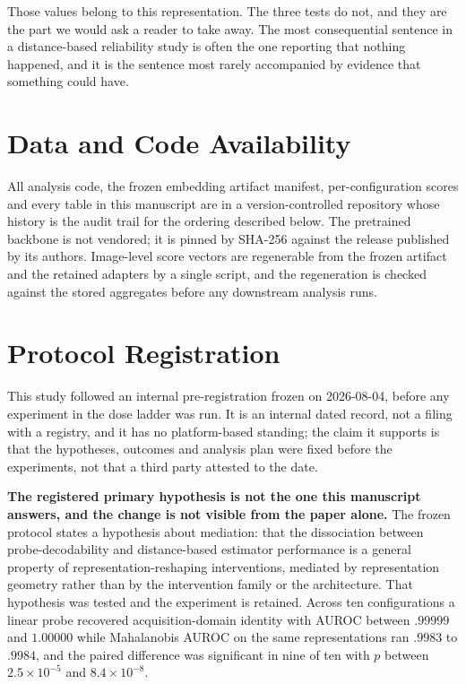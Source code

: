 \documentclass[11pt,a4paper]{article}
\begin{document}
Those values belong to this representation. The three tests do not, and they
are the part we would ask a reader to take away. The most consequential
sentence in a distance-based reliability study is often the one reporting that
nothing happened, and it is the sentence most rarely accompanied by evidence
that something could have.

\section*{Data and Code Availability}
All analysis code, the frozen embedding artifact manifest, per-configuration
scores and every table in this manuscript are in a version-controlled
repository whose history is the audit trail for the ordering described below.
The pretrained backbone is not vendored; it is pinned by SHA-256 against the
release published by its authors. Image-level score vectors are regenerable
from the frozen artifact and the retained adapters by a single script, and the
regeneration is checked against the stored aggregates before any downstream
analysis runs.

\section*{Protocol Registration}
This study followed an internal pre-registration frozen on 2026-08-04, before
any experiment in the dose ladder was run. It is an internal dated record, not
a filing with a registry, and it has no platform-based standing; the claim it
supports is that the hypotheses, outcomes and analysis plan were fixed before
the experiments, not that a third party attested to the date.

\textbf{The registered primary hypothesis is not the one this manuscript
answers, and the change is not visible from the paper alone.} The frozen
protocol states a hypothesis about mediation: that the dissociation between
probe-decodability and distance-based estimator performance is a general
property of representation-reshaping interventions, mediated by representation
geometry rather than by the intervention family or the architecture. That
hypothesis was tested and the experiment is retained. Across ten
configurations a linear probe recovered acquisition-domain identity with AUROC
between $.99999$ and $1.00000$ while Mahalanobis AUROC on the same
representations ran $.9983$ to $.9984$, and the paired difference was
significant in nine of ten with $p$ between $2.5\times10^{-5}$ and
$8.4\times10^{-8}$.
\end{document}
